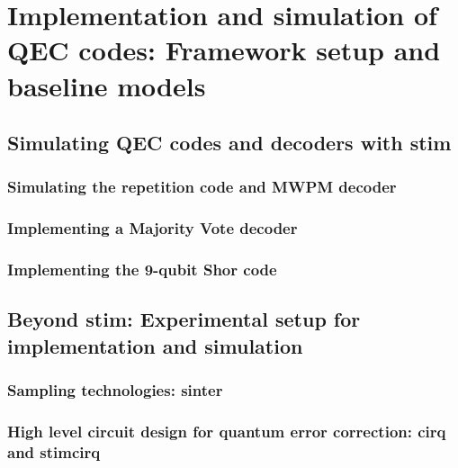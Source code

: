 \chapter{Implementation and simulation of QEC codes: Framework setup and baseline models}
\label{chap:implementation_and_simulation}

\section{Simulating QEC codes and decoders with stim}

\subsection{Simulating the repetition code and MWPM decoder}

\subsection{Implementing a Majority Vote decoder}

\subsection{Implementing the 9-qubit Shor code}

\section{Beyond stim: Experimental setup for implementation and simulation}

\subsection{Sampling technologies: sinter}

\subsection{High level circuit design for quantum error correction: cirq and stimcirq}
